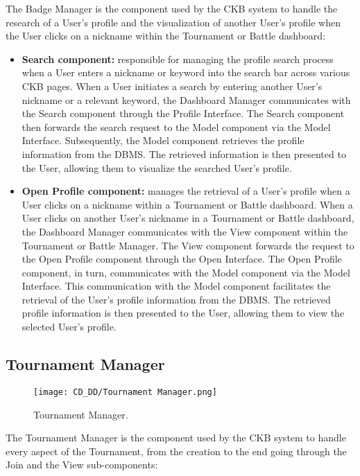 \noindent The Badge Manager is the component used by the CKB system to handle the research of a User’s profile and the visualization of another User’s profile when the User clicks on a nickname within the Tournament or Battle dashboard:
\begin{itemize}
    \item \textbf{Search component:} responsible for managing the profile search process when a User enters a nickname or keyword into the search bar across various CKB pages. When a User initiates a search by entering another User's nickname or a relevant keyword, the Dashboard Manager communicates with the Search component through the Profile Interface. The Search component then forwards the search request to the Model component via the Model Interface. Subsequently, the Model component retrieves the profile information from the DBMS. The retrieved information is then presented to the User, allowing them to visualize the searched User's profile.
    \item \textbf{Open Profile component:} manages the retrieval of a User's profile when a User clicks on a nickname within a Tournament or Battle dashboard. When a User clicks on another User's nickname in a Tournament or Battle dashboard, the Dashboard Manager communicates with the View component within the Tournament or Battle Manager. The View component forwards the request to the Open Profile component through the Open Interface. The Open Profile component, in turn, communicates with the Model component via the Model Interface. This communication with the Model component facilitates the retrieval of the User's profile information from the DBMS. The retrieved profile information is then presented to the User, allowing them to view the selected User's profile.
\end{itemize}

\subsection{Tournament Manager}
\label{subsec:tournament_manager}%

\begin{figure}[H]
    \begin{center}
        \texttt{[image: CD\_DD/Tournament Manager.png]}
        \caption{Tournament Manager.}
        \label{fig:tournament_manager}%
    \end{center}
\end{figure}

\noindent The Tournament Manager is the component used by the CKB system to handle every aspect of the Tournament, from the creation to the end going through the Join and the View sub-components:

